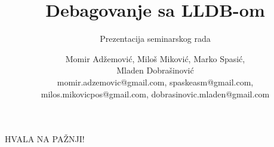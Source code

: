 \documentclass[bookmarks=true,bookmarksopen=true,pdfborder={0 0 0},pdfhighlight={/N},linkbor
dercolor={.5 .5 .5},implicit=false,unicode
]{beamer}
\begin{document}
\title{Debagovanje sa LLDB-om}
\author{Momir Adžemović, Miloš Miković, Marko Spasić,\\ Mladen Dobrašinović\\ \small momir.adzemovic@gmail.com, spaskeasm@gmail.com,\\ \small milos.mikovicpos@gmail.com, dobrasinovic.mladen@gmail.com}
\subtitle{Prezentacija seminarskog rada}
\date{}


\begin{frame}
  
  \titlepage{}
  
\end{frame}


\section*{}
\begin{frame}
  \begin{center}
    {\Large HVALA NA PAŽNJI!}
  \end{center}
\end{frame}
\end{document}
